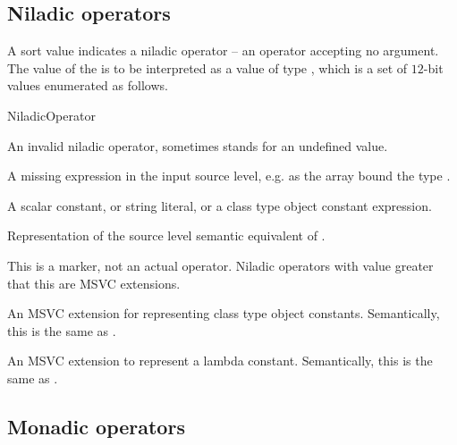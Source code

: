 \subsection{Niladic operators}
\label{sec:ifc:OperatorSort:Niladic}

A sort value  indicates a niladic operator -- 
an operator accepting no argument.  The
value of the  is to be interpreted as a value of type 
, which is a set of $12$-bit values enumerated as follows.
%
\begin{Enumeration}{NiladicOperator}

	\setcounter{enumi}{1023}
\end{Enumeration}

An invalid niladic operator, sometimes stands for an undefined value.

A missing expression in the input source level, e.g. as the array bound the type .

A scalar constant, or string literal, or a class type object constant expression.

Representation of the source level semantic equivalent of .

This is a marker, not an actual operator. Niladic operators with 
value greater that this are MSVC extensions.

An MSVC extension for representing class type object constants.
Semantically, this is the same as .


An MSVC extension to represent a lambda constant.
Semantically, this is the same as .



\subsection{Monadic operators}
\label{sec:ifc:OperatorSort:Monadic}

